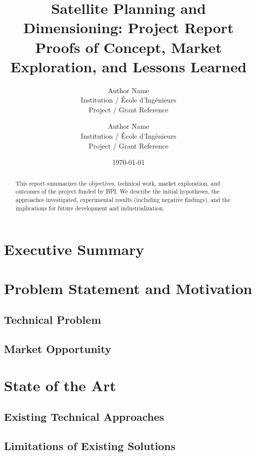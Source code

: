 \documentclass[11pt,a4paper]{article}
\title{Satellite Planning and Dimensioning: Project Report\\
\large Proofs of Concept, Market Exploration, and Lessons Learned}
\author{
Author Name \\
Institution / École d’Ingénieurs \\
Project / Grant Reference
}
\author{
Author Name \\
Institution / École d’Ingénieurs \\
Project / Grant Reference
}
\date{\today}
\begin{document}
\maketitle

\begin{abstract}
This report summarizes the objectives, technical work, market exploration, and outcomes of the project funded by BPI. 
We describe the initial hypotheses, the approaches investigated, experimental results (including negative findings),
and the implications for future development and industrialization.
\end{abstract}

\section{Executive Summary}

\section{Problem Statement and Motivation}
\subsection{Technical Problem}

\subsection{Market Opportunity}

\section{State of the Art}
\subsection{Existing Technical Approaches}

\subsection{Limitations of Existing Solutions}
\end{document}
